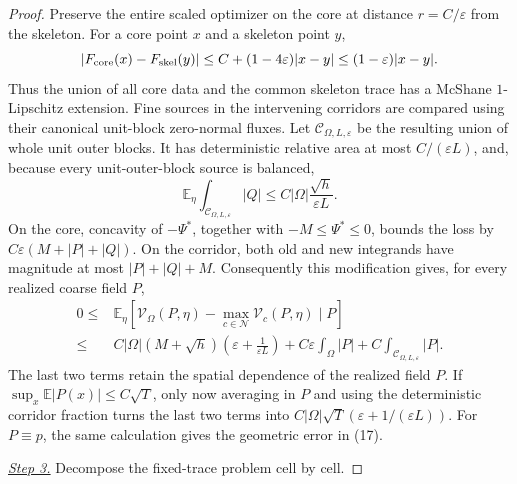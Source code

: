 \documentclass{smfart}
\theoremstyle{definition}
\newcommand{\1}{\mathbf 1}
\begin{document}
\begin{proof}
Preserve the entire scaled optimizer on the core at distance
$r=C/\varepsilon$ from the skeleton. For a core
point $x$ and a skeleton point $y$,
\begin{equation*}
|F_ {\rm core}(x)-F_ {\rm skel}(y)|
\leq C+(1-4\varepsilon)|x-y|\leq(1-\varepsilon)|x-y|.
\end{equation*}
Thus the union of all core data and the common skeleton trace has a
McShane $1$-Lipschitz extension.  Fine sources in the intervening
corridors are compared using their canonical unit-block zero-normal
fluxes.  Let $\mathcal C_ {\Omega,L,\varepsilon}$ be the resulting
union of whole unit outer blocks.  It has deterministic relative area at most
$C/(\varepsilon L)$, and, because every unit-outer-block source is balanced,
\begin{equation}
\mathbb E_ \eta\int_ {\mathcal C_ {\Omega,L,\varepsilon}}|Q|
\leq C|\Omega|\frac{\sqrt h}{\varepsilon L}.
\tag{21a}
\end{equation}
On the core, concavity of $-\Psi^*$, together with
$-M\leq\Psi^*\leq0$, bounds the loss by
$C\varepsilon(M+|P|+|Q|)$.  On the corridor, both old and new
integrands have magnitude at most $|P|+|Q|+M$.  Consequently this modification
gives, for every realized coarse field $P$,
\begin{equation}
\begin{split}
0\leq{}&\mathbb E_ \eta[\mathcal V_ \Omega(P,\eta)
-\max_ {c\in\mathcal N}\mathcal V_ c(P,\eta)\mid P]\\
\leq{}&C|\Omega|(M+\sqrt h)
\left(\varepsilon+\frac1{\varepsilon L}\right)
+C\varepsilon\int_ \Omega|P|
+C\int_ {\mathcal C_ {\Omega,L,\varepsilon}}|P|.          
\end{split}
\tag{21a'}
\end{equation}
The last two terms retain the spatial dependence of the realized field
$P$.  If
$\sup_ x\mathbb E|P(x)|\leq C\sqrt T$, only now averaging in $P$
and using the deterministic corridor fraction turns the last two terms
into $C|\Omega|\sqrt T(\varepsilon+1/(\varepsilon L))$.  For
$P\equiv p$, the same calculation gives the geometric error in (17).

\smallskip\noindent
\underline{\textit{Step 3.}} Decompose the fixed-trace problem cell by cell.


\end{proof}
\end{document}
